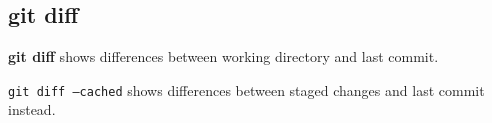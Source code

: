 %

\subsection{git diff}
\textbf{git diff} shows differences between working directory and last commit.

\texttt{git diff --cached} shows differences between staged changes and last commit instead.

%